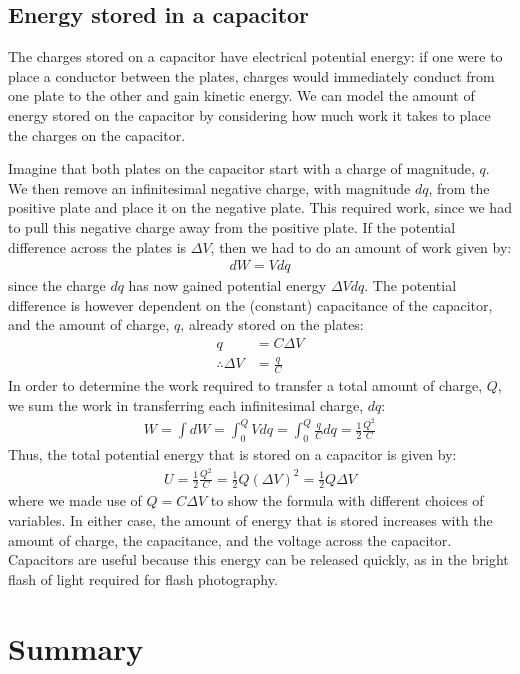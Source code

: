 \subsection{Energy stored in a capacitor}
The charges stored on a capacitor have electrical potential energy: if one were to place a conductor between the plates, charges would immediately conduct from one plate to the other and gain kinetic energy. We can model the amount of energy stored on the capacitor by considering how much work it takes to place the charges on the capacitor.

Imagine that both plates on the capacitor start with a charge of magnitude, $q$. We then remove an infinitesimal negative charge, with magnitude $dq$, from the positive plate and place it on the negative plate. This required work, since we had to pull this negative charge away from the positive plate. If the potential difference across the plates is $\Delta V$, then we had to do an amount of work given by:
\begin{align*}
dW = Vdq
\end{align*}
since the charge $dq$ has now gained potential energy $\Delta Vdq$. The potential difference is however dependent on the (constant) capacitance of the capacitor, and the amount of charge, $q$, already stored on the plates:
\begin{align*}
q &= C\Delta V\\
\therefore \Delta V&=\frac{q}{C}
\end{align*}
In order to determine the work required to transfer a total amount of charge, $Q$, we sum the work in transferring each infinitesimal charge, $dq$:
\begin{align*}
W=\int dW=\int_0^Q Vdq=\int_0^Q \frac{q}{C}dq=\frac{1}{2}\frac{Q^2}{C}
\end{align*}
Thus, the total potential energy that is stored on a capacitor is given by:
\begin{align*}
U = \frac{1}{2}\frac{Q^2}{C} = \frac{1}{2}Q(\Delta V)^2=\frac{1}{2}Q\Delta V
\end{align*}
where we made use of $Q=C\Delta V$ to show the formula with different choices of variables. In either case, the amount of energy that is stored increases with the amount of charge, the capacitance, and the voltage across the capacitor. Capacitors are useful because this energy can be released quickly, as in the bright flash of light required for flash photography.

\newpage
\section{Summary}

